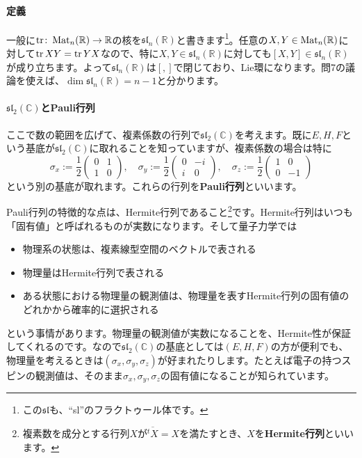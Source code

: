 \paragraph{定義}

一般に$\operatorname{tr}\colon \operatorname{Mat}_n(\mathbb{R}) \rightarrow \mathbb{R}$の核を$\mathfrak{sl}_n(\mathbb{R})$と書きます\footnote{この$\mathfrak{sl}$も、``sl''のフラクトゥール体です。}。任意の$X, Y \in \operatorname{Mat}_n(\mathbb{R})$に対して$\operatorname{tr} XY = \operatorname{tr} YX$なので、特に$X, Y\in\mathfrak{sl}_n(\mathbb{R})$に対しても$[X, Y] \in \mathfrak{sl}_n(\mathbb{R})$が成り立ちます。よって$\mathfrak{sl}_n(\mathbb{R})$は$[, ]$で閉じており、Lie環になります。問7の議論を使えば、$\dim \mathfrak{sl}_n(\mathbb{R}) = n - 1$と分かります。

\paragraph{$\mathfrak{sl}_2(\mathbb{C})$とPauli行列}

ここで数の範囲を広げて、複素係数の行列で$\mathfrak{sl}_2(\mathbb{C})$を考えます。既に$E, H, F$という基底が$\mathfrak{sl}_2(\mathbb{C})$に取れることを知っていますが、複素係数の場合は特に
\[
\sigma_x := 
\frac{1}{2}
\begin{pmatrix}
0 & 1 \\
1 & 0
\end{pmatrix}, \quad
\sigma_y := 
\frac{1}{2}
\begin{pmatrix}
0 & -i \\
i & 0 
\end{pmatrix}, \quad
\sigma_z := 
\frac{1}{2}
\begin{pmatrix}
1 & 0 \\
0 & -1
\end{pmatrix}
\]
という別の基底が取れます。これらの行列を\textbf{Pauli行列}といいます。

Pauli行列の特徴的な点は、Hermite行列であること\footnote{複素数を成分とする行列$X$が$\overline{{}^tX} = X$を満たすとき、$X$を\textbf{Hermite行列}といいます。}です。Hermite行列はいつも「固有値」と呼ばれるものが実数になります。そして量子力学では
\begin{itemize}
\item 物理系の状態は、複素線型空間のベクトルで表される
\item 物理量はHermite行列で表される
\item ある状態における物理量の観測値は、物理量を表すHermite行列の固有値のどれかから確率的に選択される
\end{itemize}
という事情があります。物理量の観測値が実数になることを、Hermite性が保証してくれるのです。なので$\mathfrak{sl}_2(\mathbb{C})$の基底としては$(E, H, F)$の方が便利でも、物理量を考えるときは$(\sigma_x, \sigma_y, \sigma_z)$が好まれたりします。たとえば電子の持つスピンの観測値は、そのまま$\sigma_x, \sigma_y, \sigma_z$の固有値になることが知られています。

